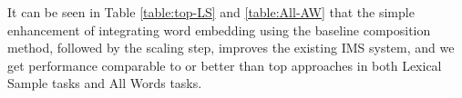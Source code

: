 It can be seen in Table \ref{table:top-LS} and \ref{table:All-AW} that the simple enhancement of integrating word embedding using the baseline composition method, followed by the scaling step, improves the existing IMS system, and we get performance comparable to or better than top approaches in both Lexical Sample tasks and All Words tasks. 

